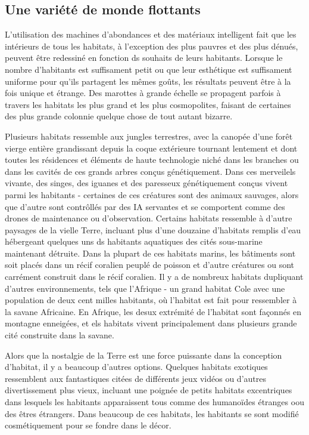                \subsection{Une variété de monde flottants} \label{sec:divers-float-worlds} 

               L'utilisation des machines d'abondances et des matériaux intelligent fait que les intérieurs de tous les habitats, à l'exception des plus pauvres et des plus dénués, peuvent être redessiné en fonction ds souhaits de leurs habitants. Lorsque le nombre d'habitants est suffisament petit ou que leur esthétique est suffisament uniforme pour qu'ils partagent les mêmes goûts, les résultats peuvent être à la fois unique et étrange. Des marottes à grande échelle se propagent parfois à travers les habitats les plus grand et les plus cosmopolites, faisant de certaines des plus grande colonnie quelque chose de tout autant bizarre. 

               Plusieurs habitats ressemble aux jungles terrestres, avec la canopée d'une forêt vierge entière grandissant depuis la coque extérieure tournant lentement et dont toutes les résidences et éléments de haute technologie niché dans les branches ou dans les cavités de ces grands arbres conçus génétiquement. Dans ces merveilels vivante, des singes, des iguanes et des paresseux génétiquement conçus vivent parmi les habitants - certaines de ces créatures sont des animaux sauvages, alors que d'autre sont contrôllés par des IA servantes et se comportent comme des drones de maintenance ou d'observation. Certains habitats ressemble à d'autre paysages de la vielle Terre, incluant plus d'une douzaine d'habitats remplis d'eau hébergeant quelques uns ds habitants aquatiques des cités sous-marine maintenant détruite. Dans la plupart de ces habitats marins, les bâtiments sont soit placés dans un récif coralien peuplé de poisson et d'autre créatures ou sont carrément construit dans le récif coralien. Il y a de nombreux habitats dupliquant d'autres environnements, tels que l'Afrique - un grand habitat Cole avec une population de deux cent milles habitants, où l'habitat est fait pour ressembler à la savane Africaine. En Afrique, les desux extrémité de l'habitat sont façonnés en montagne enneigées, et els habitats vivent principalement dans plusieurs grande cité construite dans la savane. 

               Alors que la nostalgie de la Terre est une force puissante dans la conception d'habitat, il y a beaucoup d'autres options. Quelques habitats exotiques ressemblent aux fantastiques citées de différents jeux vidéos ou d'autres divertissement plus vieux, incluant une poignée de petits habitats excentriques dans lesquels les habitants apparaissent tous comme des humanoïdes étranges oou des êtres étrangers. Dans beaucoup de ces habitats, les habitants se sont modifié cosmétiquement pour se fondre dans le décor. 


